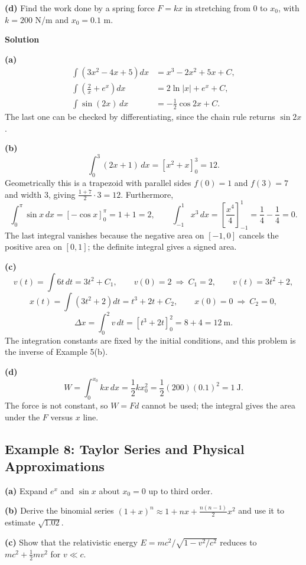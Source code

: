 \documentclass[../main.tex]{subfiles}
\begin{document}
\textbf{(d)} Find the work done by a spring force $F = kx$ in stretching from $0$ to $x_0$, with $k = 200$ N/m and $x_0 = 0.1$ m.

\bigskip
\textbf{Solution}

\textbf{(a)}
\begin{align*}
\int\left(3x^2-4x+5\right)dx &= x^3-2x^2+5x+C, \\
\int\left(\frac{2}{x}+e^x\right)dx &= 2\ln|x| + e^x + C, \\
\int\sin(2x)\,dx &= -\frac{1}{2}\cos 2x + C .
\end{align*}
The last one can be checked by differentiating, since the chain rule returns $\sin 2x$.

\textbf{(b)}
\[
\int_0^3(2x+1)\,dx = \left[x^2+x\right]_0^3 = 12 .
\]
Geometrically this is a trapezoid with parallel sides $f(0) = 1$ and $f(3) = 7$ and width $3$, giving $\frac{1+7}{2}\cdot 3 = 12$. Furthermore,
\[
\int_0^\pi \sin x\,dx = \left[-\cos x\right]_0^\pi = 1+1 = 2,
\qquad
\int_{-1}^{1}x^3\,dx = \left[\frac{x^4}{4}\right]_{-1}^{1} = \frac{1}{4}-\frac{1}{4} = 0 .
\]
The last integral vanishes because the negative area on $[-1,0]$ cancels the positive area on $[0,1]$; the definite integral gives a signed area.

\textbf{(c)}
\[
v(t) = \int 6t\,dt = 3t^2+C_1,
\qquad
v(0) = 2 \ \Longrightarrow \ C_1 = 2,
\qquad
v(t) = 3t^2+2 ,
\]
\[
x(t) = \int\left(3t^2+2\right)dt = t^3+2t+C_2,
\qquad
x(0) = 0 \ \Longrightarrow \ C_2 = 0 ,
\]
\[
\Delta x = \int_0^2 v\,dt = \left[t^3+2t\right]_0^2 = 8+4 = 12\ \text{m}.
\]
The integration constants are fixed by the initial conditions, and this problem is the inverse of Example 5(b).

\textbf{(d)}
\[
W = \int_0^{x_0} kx\,dx = \frac{1}{2}kx_0^2 = \frac{1}{2}(200)(0.1)^2 = 1\ \text{J}.
\]
The force is not constant, so $W = Fd$ cannot be used; the integral gives the area under the $F$ versus $x$ line.


\subsection{Example 8: Taylor Series and Physical Approximations}

\textbf{(a)} Expand $e^x$ and $\sin x$ about $x_0 = 0$ up to third order.

\textbf{(b)} Derive the binomial series $(1+x)^n \approx 1+nx+\frac{n(n-1)}{2}x^2$ and use it to estimate $\sqrt{1.02}$.

\textbf{(c)} Show that the relativistic energy $E = mc^2/\sqrt{1-v^2/c^2}$ reduces to $mc^2+\frac{1}{2}mv^2$ for $v \ll c$.
\end{document}
